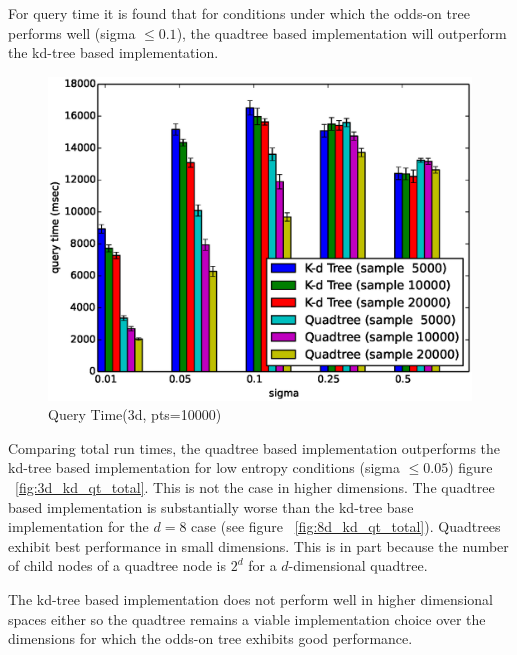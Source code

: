 \documentclass[mcs]{scsthesis}
\begin{document}
For query time it is found that for conditions under which the odds-on tree
performs well (sigma \(\le 0.1\)), the quadtree based implementation will
outperform the kd-tree based implementation.

\begin{figure}
\begin{center}
\includegraphics[scale=0.5]{diagrams/3d_qt_kt_pts10000_qtime.eps}
\caption{Query Time(3d, pts=10000)}
\label{fig:3d_kd_qt_qtime}
\end{center}
\end{figure}

Comparing total run times, the quadtree based implementation outperforms the
kd-tree based implementation for low entropy conditions (sigma \(\le 0.05\))
figure ~\ref{fig:3d_kd_qt_total}. This is not the case in higher dimensions.
The quadtree based implementation is substantially worse than the kd-tree
base implementation for the \(d = 8\) case (see figure ~\ref{fig:8d_kd_qt_total}).
Quadtrees exhibit best performance in small dimensions. This is in part because
the number of child nodes of a quadtree node is \(2^d\) for a \(d\)-dimensional
quadtree.

The kd-tree based implementation does not perform well in higher dimensional
spaces either so the quadtree remains a viable implementation choice over the
dimensions for which the odds-on tree exhibits good performance.
\end{document}

